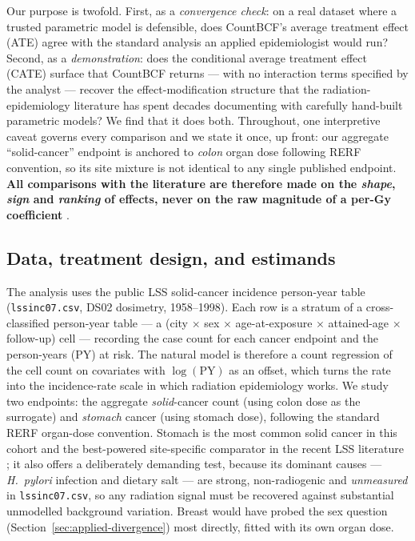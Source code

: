 \documentclass[11pt]{article}
\begin{document}
Our purpose is twofold. First, as a \emph{convergence check}: on a real
dataset where a trusted parametric model is defensible, does CountBCF's
average treatment effect (ATE) agree with the standard analysis an applied
epidemiologist would run? Second, as a \emph{demonstration}: does the
conditional average treatment effect (CATE) surface that CountBCF returns
--- with no interaction terms specified by the analyst --- recover the
effect-modification structure that the radiation-epidemiology literature has
spent decades documenting with carefully hand-built parametric models? We
find that it does both. Throughout, one interpretive caveat governs every
comparison and we state it once, up front: our aggregate ``solid-cancer''
endpoint is anchored to \emph{colon} organ dose following RERF convention,
so its site mixture is not identical to any single published endpoint.
\textbf{All comparisons with the literature are therefore made on the
\emph{shape}, \emph{sign} and \emph{ranking} of effects, never on the raw
magnitude of a per-Gy coefficient} \citep{cologne2019}.

\subsection{Data, treatment design, and estimands}
\label{sec:applied-design}

The analysis uses the public LSS solid-cancer incidence person-year table
(\texttt{lssinc07.csv}, DS02 dosimetry, 1958--1998). Each row is a stratum
of a cross-classified person-year table --- a (city $\times$ sex $\times$
age-at-exposure $\times$ attained-age $\times$ follow-up) cell --- recording
the case count for each cancer endpoint and the person-years (PY) at risk.
The natural model is therefore a count regression of the cell count on
covariates with $\log(\text{PY})$ as an offset, which turns the rate into
the incidence-rate scale in which radiation epidemiology works. We study two
endpoints: the aggregate \emph{solid}-cancer count (using colon dose as the
surrogate) and \emph{stomach} cancer (using stomach dose), following the
standard RERF organ-dose convention. Stomach is the most common solid cancer
in this cohort and the best-powered site-specific comparator in the recent
LSS literature \citep{sakata2019}; it also offers a deliberately demanding
test, because its dominant causes --- \emph{H.\ pylori} infection and dietary
salt --- are strong, non-radiogenic and \emph{unmeasured} in
\texttt{lssinc07.csv}, so any radiation signal must be recovered against
substantial unmodelled background variation. Breast would have probed the sex
question (Section~\ref{sec:applied-divergence}) most directly, fitted with its
own organ dose.
\end{document}
